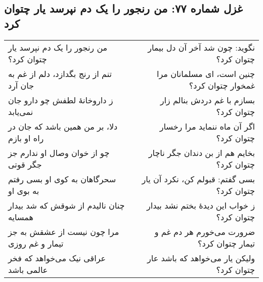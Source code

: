 \begin{center}
\section*{غزل شماره ۷۷: من رنجور را یک دم نپرسد یار چتوان کرد}
\label{sec:077}
\begin{longtable}{l p{0.5cm} r}
من رنجور را یک دم نپرسد یار چتوان کرد؟
&&
نگوید: چون شد آخر آن دل بیمار چتوان کرد؟
\\
تنم از رنج بگدازد، دلم از غم به جان آرد
&&
چنین است، ای مسلمانان مرا غمخوار چتوان کرد؟
\\
ز داروخانهٔ لطفش چو دارو جان نمی‌یابد
&&
بسازم با غم دردش بنالم زار چتوان کرد؟
\\
دلا، بر من همین باشد که جان در راه او بازم
&&
اگر آن ماه ننماید مرا رخسار چتوان کرد؟
\\
چو از خوان وصال او ندارم جز جگر قوتی
&&
بخایم هم از بن دندان جگر ناچار چتوان کرد؟
\\
سحرگاهان به کوی او بسی رفتم به بوی او
&&
بسی گفتم: قبولم کن، نکرد آن یار چتوان کرد؟
\\
چنان نالیدم از شوقش که شد بیدار همسایه
&&
ز خواب این دیدهٔ بختم نشد بیدار چتوان کرد؟
\\
مرا چون نیست از عشقش به جز تیمار و غم روزی
&&
ضرورت می‌خورم هر دم غم و تیمار چتوان کرد؟
\\
عراقی نیک می‌خواهد که فخر عالمی باشد
&&
ولیکن یار می‌خواهد که باشد عار چتوان کرد؟
\\
\end{longtable}
\end{center}

